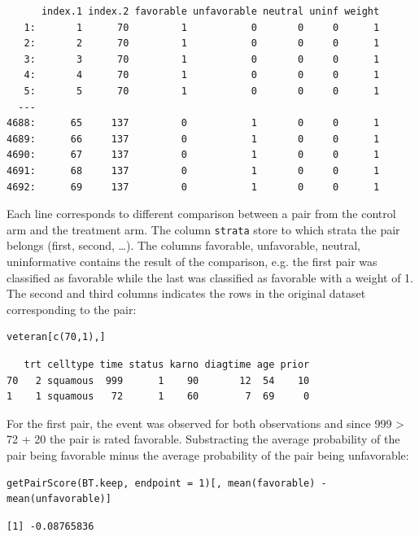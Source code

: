 \documentclass[12pt]{article}
\begin{document}
\begin{verbatim}
      index.1 index.2 favorable unfavorable neutral uninf weight
   1:       1      70         1           0       0     0      1
   2:       2      70         1           0       0     0      1
   3:       3      70         1           0       0     0      1
   4:       4      70         1           0       0     0      1
   5:       5      70         1           0       0     0      1
  ---                                                           
4688:      65     137         0           1       0     0      1
4689:      66     137         0           1       0     0      1
4690:      67     137         0           1       0     0      1
4691:      68     137         0           1       0     0      1
4692:      69     137         0           1       0     0      1
\end{verbatim}

Each line corresponds to different comparison between a pair from the
control arm and the treatment arm. The column \texttt{strata} store to which
strata the pair belongs (first, second, \ldots{}). The columns favorable,
unfavorable, neutral, uninformative contains the result of the
comparison, e.g. the first pair was classified as favorable while the
last was classified as favorable with a weight of 1. The second and
third columns indicates the rows in the original dataset corresponding
to the pair:
\lstset{language=r,label= ,caption= ,captionpos=b,numbers=none}
\begin{lstlisting}
veteran[c(70,1),]
\end{lstlisting}

\begin{verbatim}
   trt celltype time status karno diagtime age prior
70   2 squamous  999      1    90       12  54    10
1    1 squamous   72      1    60        7  69     0
\end{verbatim}



For the first pair, the event was observed for both observations and
since 999 > 72 + 20 the pair is rated favorable. Substracting the
average probability of the pair being favorable minus the average
probability of the pair being unfavorable:
\lstset{language=r,label= ,caption= ,captionpos=b,numbers=none}
\begin{lstlisting}
getPairScore(BT.keep, endpoint = 1)[, mean(favorable) - mean(unfavorable)]
\end{lstlisting}

\begin{verbatim}
[1] -0.08765836
\end{verbatim}
\end{document}
